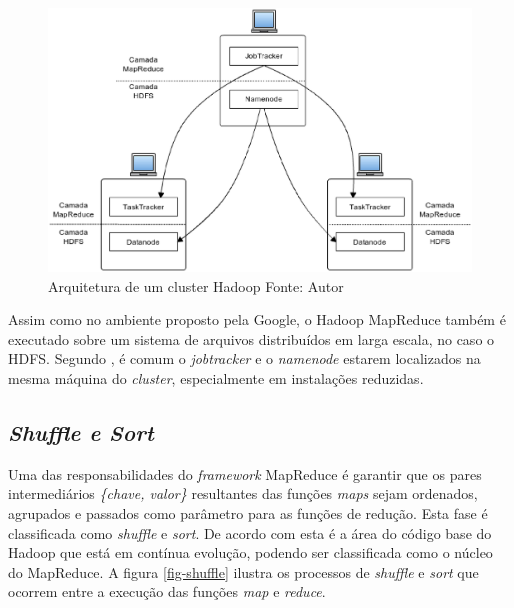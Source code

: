 \begin{figure}[ht!]
	\centering
	\includegraphics[keepaspectratio=true,scale=0.6]
	  {figuras/mapreduce-arquitetura.eps}
	\caption[Arquitetura de um cluster Hadoop]{Arquitetura de um cluster Hadoop
	\protect\linebreak Fonte: Autor}
	\label{fig-mapreduce-arquitetura}
\end{figure}
\FloatBarrier

Assim como no ambiente proposto pela Google, o Hadoop MapReduce também é executado sobre um sistema de arquivos distribuídos em larga escala, no caso o HDFS. Segundo , é comum o \textit{jobtracker} e o \textit{namenode} estarem localizados na mesma máquina do \textit{cluster}, especialmente em instalações reduzidas.

\subsection{\textit{Shuffle e Sort}}

Uma das responsabilidades do \textit{framework} MapReduce é garantir que os pares intermediários \textit{\{chave, valor\}} resultantes das funções \textit{maps} sejam ordenados, agrupados e passados como parâmetro para as funções de redução. Esta fase é classificada como \textit{shuffle} e \textit{sort}. De acordo com  esta é a área do código base do Hadoop que está em contínua evolução, podendo ser classificada como o núcleo do MapReduce. A figura \ref{fig-shuffle} ilustra os processos de \textit{shuffle} e \textit{sort} que ocorrem entre a execução das funções \textit{map} e \textit{reduce}.

